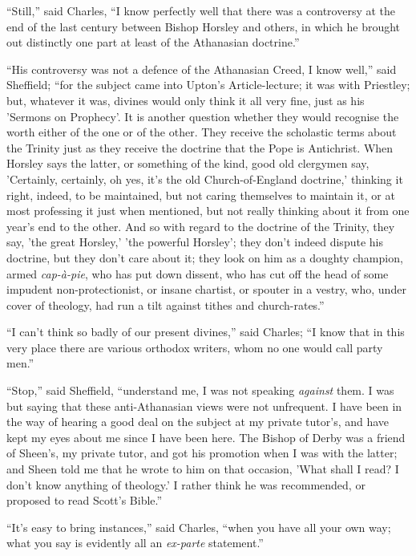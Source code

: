 ``Still,'' said Charles, ``I know perfectly well that
there was a controversy at the end of the last century between Bishop
Horsley and others, in which he brought out distinctly one part at
least of the Athanasian doctrine.''

``His controversy was not a defence of the Athanasian Creed, I
know well,'' said Sheffield; ``for the subject came into Upton's
Article-lecture; it was with Priestley; but, whatever it was, divines
would only think it all very fine, just as his 'Sermons on Prophecy'.
It is another question whether they would recognise the worth either
of the one or of the other. They receive the scholastic terms
about the Trinity just as they receive the doctrine that the Pope is
Antichrist. When Horsley says the latter, or something of the kind,
good old clergymen say, 'Certainly, certainly, oh yes, it's the old
Church-of-England doctrine,' thinking it right, indeed, to be
maintained, but not caring themselves to maintain it, or at most
professing it just when mentioned, but not really thinking about it
from one year's end to the other. And so with regard to the doctrine
of the Trinity, they say, 'the great Horsley,' 'the powerful Horsley';
they don't indeed dispute his doctrine, but they don't care about it;
they look on him as a doughty champion, armed \emph{cap-à-pie}, who
has put down dissent, who has cut off the head of some impudent
non-protectionist, or insane chartist, or spouter in a vestry, who,
under cover of theology, had run a tilt against tithes and
church-rates.''

``I can't think so badly of our present divines,'' said
Charles; ``I know that in this very place there are various
orthodox writers, whom no one would call party men.''

``Stop,'' said Sheffield, ``understand me, I was not
speaking \emph{against} them. I was but saying that these anti-Athanasian
views were not unfrequent. I have been in the way of hearing a good
deal on the subject at my private tutor's, and have kept my eyes about
me since I have been here. The Bishop of Derby was a friend of Sheen's,
my private tutor, and got his promotion when I was with the latter;
and Sheen told me that he wrote to him on that occasion, 'What shall I
read? I don't know anything of theology.' I rather think he was
recommended, or proposed to read Scott's Bible.''

``It's easy to bring instances,'' said Charles, ``when
you have all your own way; what you say is evidently all an \emph{ex-parte}
statement.''

